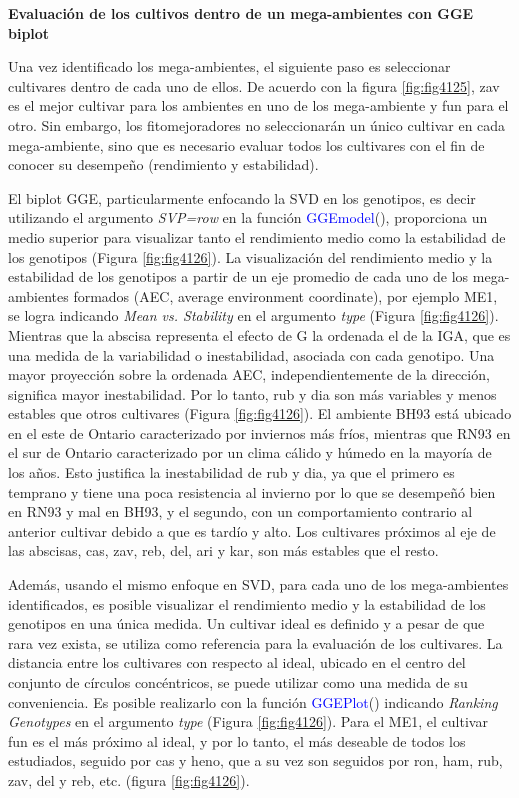 \textbf{Evaluación de los cultivos dentro de un mega-ambientes con GGE biplot}

Una vez identificado los mega-ambientes, el siguiente paso es seleccionar cultivares dentro de cada uno de ellos. De acuerdo con la figura  \ref{fig:fig4125}, zav es el mejor cultivar para los ambientes en uno de los mega-ambiente y fun para el otro. Sin embargo, los fitomejoradores no seleccionarán un único cultivar en cada mega-ambiente, sino que es necesario evaluar todos los cultivares con el fin de conocer su desempeño (rendimiento y estabilidad).

El biplot GGE, particularmente enfocando la SVD en los genotipos, es decir utilizando el argumento \emph{SVP=row} en la función \textcolor{blue}{GGEmodel}(), proporciona un medio superior para visualizar tanto el rendimiento medio como la estabilidad de los genotipos (Figura \ref{fig:fig4126}). La visualización del rendimiento medio y la estabilidad de los genotipos a partir de un eje promedio de cada uno de los mega-ambientes formados (AEC, average environment coordinate), por ejemplo ME1, se logra indicando \emph{Mean vs. Stability} en el argumento \emph{type} (Figura \ref{fig:fig4126}). Mientras que la abscisa representa el efecto de G la ordenada el de la IGA, que es una medida de la variabilidad o inestabilidad, asociada con cada genotipo. Una mayor proyección sobre la ordenada AEC, independientemente de la dirección, significa mayor inestabilidad. Por lo tanto, rub y dia son más variables y menos estables que otros cultivares (Figura \ref{fig:fig4126}). El ambiente BH93 está ubicado en el este de Ontario caracterizado por inviernos más fríos, mientras que RN93 en el sur de Ontario caracterizado por un clima cálido y húmedo en la mayoría de los años. Esto justifica la inestabilidad de rub y dia, ya que el primero es temprano y tiene una poca resistencia al invierno por lo que se desempeñó bien en RN93 y mal en BH93, y el segundo, con un comportamiento contrario al anterior cultivar debido a que es tardío y alto. Los cultivares próximos al eje de las abscisas, cas, zav, reb, del, ari y kar, son más estables que el resto. 

Además, usando el mismo enfoque en SVD, para cada uno de los mega-ambientes identificados, es posible visualizar  el rendimiento medio y la estabilidad de los genotipos en una única medida. Un cultivar ideal es definido y a pesar de que rara vez exista, se utiliza como referencia para la evaluación de los cultivares. La distancia entre los cultivares con respecto al ideal, ubicado en el centro del conjunto de círculos concéntricos, se puede utilizar como una medida de su conveniencia. Es posible realizarlo con la función \textcolor{blue}{GGEPlot}() indicando \emph{Ranking Genotypes} en el argumento \emph{type} (Figura \ref{fig:fig4126}). Para el ME1, el cultivar fun es el más próximo al ideal, y por lo tanto, el más deseable de todos los estudiados, seguido por cas y heno, que a su vez son seguidos por ron, ham, rub, zav, del y reb, etc. (figura \ref{fig:fig4126}).


